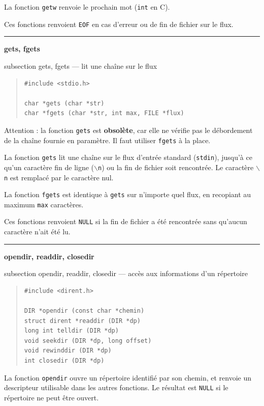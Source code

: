 \documentclass [twoside] {report}
\newcommand {\primitive} [1]
    {
	\phantomsection
	{\large \textbf {#1}}
	\addcontentsline {toc} {subsection} {#1}
    }
\newcommand {\separation}
    {
	\vspace {5mm}
	\nopagebreak
	\hrule
    }
\begin{document}
La fonction \texttt {getw} renvoie le prochain mot (\texttt {int} en C).

Ces fonctions renvoient \texttt {EOF} en cas d'erreur ou de fin de
fichier sur le flux.



\separation
\primitive {gets, fgets} --- lit une chaîne sur le flux

\begin {quote}
\begin {verbatim}
#include <stdio.h>

char *gets (char *str)
char *fgets (char *str, int max, FILE *flux)
\end{verbatim}
\end {quote}

Attention : la fonction \texttt {gets} est \textbf {obsolète}, car elle ne
vérifie pas le débordement de la chaîne fournie en paramètre. Il
faut utiliser \texttt {fgets} à la place.

La fonction \texttt {gets} lit une chaîne sur le flux d'entrée
standard (\texttt {stdin}), jusqu'à ce qu'un caractère fin de ligne
(\texttt {$\backslash$n}) ou la fin de fichier soit rencontrée. Le caractère
\texttt {$\backslash$n} est remplacé par le caractère nul.

La fonction \texttt {fgets} est identique à \texttt {gets} sur n'importe
quel flux, en recopiant au maximum \texttt {max} caractères.

Ces fonctions renvoient \texttt {NULL} si la fin de fichier a été
rencontrée sans qu'aucun caractère n'ait été lu.


\separation
\primitive {opendir, readdir, closedir} --- accès aux informations d'un répertoire
    \label {opendir}

\begin {quote}
\begin {verbatim}
#include <dirent.h>

DIR *opendir (const char *chemin)
struct dirent *readdir (DIR *dp)
long int telldir (DIR *dp)
void seekdir (DIR *dp, long offset)
void rewinddir (DIR *dp)
int closedir (DIR *dp)
\end{verbatim}
\end {quote}

La fonction \texttt {opendir} ouvre un répertoire identifié par son
chemin, et
renvoie un descripteur utilisable dans les autres fonctions. Le résultat
est \texttt {NULL} si le répertoire ne peut être ouvert.
\end{document}
